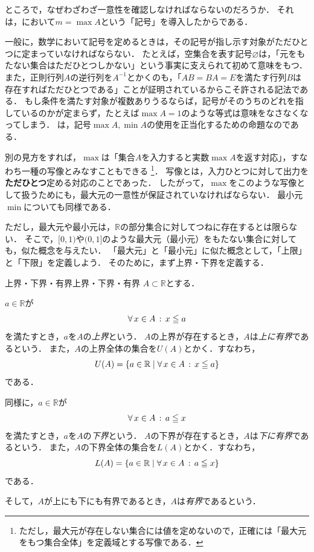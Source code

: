 \begin{remark}[一意性と記号の正当化]
  ところで，なぜわざわざ一意性を確認しなければならないのだろうか．
  それは，において$m = \max A$という「記号」を導入したからである．

  一般に，数学において記号を定めるときは，その記号が指し示す対象がただひとつに定まっていなければならない．
  たとえば，空集合を表す記号$\varnothing$は，「元をもたない集合はただひとつしかない」という事実に支えられて初めて意味をもつ．
  また，正則行列$A$の逆行列を$A^{-1}$とかくのも，「$AB = BA = E$を満たす行列$B$は存在すればただひとつである」ことが証明されているからこそ許される記法である．
  もし条件を満たす対象が複数ありうるならば，記号がそのうちのどれを指しているのかが定まらず，たとえば$\max A = 1$のような等式は意味をなさなくなってしまう．
  は，記号$\max A,\min A$の使用を正当化するための命題なのである．

  別の見方をすれば，$\max$は「集合$A$を入力すると実数$\max A$を返す対応」，すなわち一種の写像とみなすこともできる%
  \footnote{ただし，最大元が存在しない集合には値を定めないので，正確には「最大元をもつ集合全体」を定義域とする写像である．}．
  写像とは，入力ひとつに対して出力を\textbf{ただひとつ}定める対応のことであった．
  したがって，$\max$をこのような写像として扱うためにも，最大元の一意性が保証されていなければならない．
  最小元$\min$についても同様である．
\end{remark}

ただし，最大元や最小元は，$\mathbb{R}$の部分集合に対してつねに存在するとは限らない．
そこで，$[0,1)$や$(0,1]$のような最大元（最小元）をもたない集合に対しても，似た概念を与えたい．
「最大元」と「最小元」に似た概念として，「上限」と「下限」を定義しよう．
そのために，まず上界・下界を定義する．

\begin{definition}{上界・下界・有界}{上界・下界・有界}
  $A \subset \mathbb{R}$とする．

  $a \in \mathbb{R}$が
  \[
    \forall\, x \in A \,:\, x \leqq a
  \]
  を満たすとき，$a$を$A$の\emph{上界}という．
  $A$の上界が存在するとき，$A$は\emph{上に有界}であるという．
  また，$A$の上界全体の集合を$U(A)$とかく．すなわち，
  \[
    U(A) = \{ a \in \mathbb{R} \mid \forall\, x \in A \,:\, x \leqq a \}
  \]
  である．

  同様に，$a \in \mathbb{R}$が
  \[
    \forall\, x \in A \,:\, a \leqq x
  \]
  を満たすとき，$a$を$A$の\emph{下界}という．
  $A$の下界が存在するとき，$A$は\emph{下に有界}であるという．
  また，$A$の下界全体の集合を$L(A)$とかく．すなわち，
  \[
    L(A) = \{ a \in \mathbb{R} \mid \forall\, x \in A \,:\, a \leqq x \}
  \]
  である．

  そして，$A$が上にも下にも有界であるとき，$A$は\emph{有界}であるという．
\end{definition}

